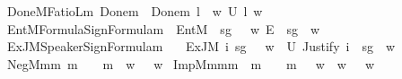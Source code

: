 \begin{isabellebody}
\isamarkupfalse%
\ DoneM{\isacharcolon}{\kern0pt}{\isacharcolon}{\kern0pt}{\isachardoublequoteopen}FatioL{\isasymRightarrow}{\isasymsigma}\isactrlsub m{\isachardoublequoteclose}\ {\isacharparenleft}{\kern0pt}{\isachardoublequoteopen}Done\isactrlsup m{\isachardoublequoteclose}{\isacharparenright}{\kern0pt}\ \ {\isachardoublequoteopen}Done\isactrlsup m\ l\ {\isasymequiv}\ {\isasymlambda}w{\isachardot}{\kern0pt}\ U\ l\ w{\isachardoublequoteclose}\isanewline
{}\isamarkupfalse%
\ EntM{\isacharcolon}{\kern0pt}{\isacharcolon}{\kern0pt}{\isachardoublequoteopen}Formula{\isasymRightarrow}Sign{\isasymRightarrow}Formula{\isasymRightarrow}{\isasymsigma}\isactrlsub m{\isachardoublequoteclose}\ \ {\isachardoublequoteopen}EntM\ {\isasymPhi}\ sg\ {\isasymphi}\ {\isasymequiv}\ {\isasymlambda}w{\isachardot}{\kern0pt}\ E\ {\isasymPhi}\ sg\ {\isasymphi}\ w{\isachardoublequoteclose}\isanewline
{}\isamarkupfalse%
\ ExJM{\isacharcolon}{\kern0pt}{\isacharcolon}{\kern0pt}{\isachardoublequoteopen}Speaker{\isasymRightarrow}Sign{\isasymRightarrow}Formula{\isasymRightarrow}{\isasymsigma}\isactrlsub m{\isachardoublequoteclose}\ \isanewline
\ \ {\isachardoublequoteopen}ExJM\ i\ sg\ {\isasymphi}\ {\isasymequiv}\ {\isasymlambda}w{\isachardot}{\kern0pt}\ {\isasymexists}{\isasymDelta}{\isachardot}{\kern0pt}\ U\ {\isacharparenleft}{\kern0pt}Justify\ i\ {\isasymDelta}\ sg\ {\isasymphi}{\isacharparenright}{\kern0pt}\ w{\isachardoublequoteclose}\isanewline
{}\isamarkupfalse%
\ NegM{\isacharcolon}{\kern0pt}{\isacharcolon}{\kern0pt}{\isachardoublequoteopen}{\isasymsigma}\isactrlsub m{\isasymRightarrow}{\isasymsigma}\isactrlsub m{\isachardoublequoteclose}\ {\isacharparenleft}{\kern0pt}{\isachardoublequoteopen}{\isasymnot}\isactrlsup m{\isacharunderscore}{\kern0pt}{\isachardoublequoteclose}\ {\isacharbrackleft}{\kern0pt}{}{}{\isacharbrackright}{\kern0pt}\ {}{}{\isacharparenright}{\kern0pt}\ \ {\isachardoublequoteopen}{\isasymnot}\isactrlsup m{\isasymphi}\ {\isasymequiv}\ {\isasymlambda}w{\isachardot}{\kern0pt}\ {\isasymnot}\ {\isasymphi}\ w{\isachardoublequoteclose}\isanewline
{}\isamarkupfalse%
\ ImpM{\isacharcolon}{\kern0pt}{\isacharcolon}{\kern0pt}{\isachardoublequoteopen}{\isasymsigma}\isactrlsub m{\isasymRightarrow}{\isasymsigma}\isactrlsub m{\isasymRightarrow}{\isasymsigma}\isactrlsub m{\isachardoublequoteclose}\ {\isacharparenleft}{\kern0pt}\ {\isachardoublequoteopen}{\isasymsupset}\isactrlsup m{\isachardoublequoteclose}\ {}{}{\isacharparenright}{\kern0pt}\ \ {\isachardoublequoteopen}{\isasymphi}\ {\isasymsupset}\isactrlsup m\ {\isasympsi}\ {\isasymequiv}\ {\isasymlambda}w{\isachardot}{\kern0pt}\ {\isasymphi}\ w\ {\isasymlongrightarrow}\ {\isasympsi}\ w{\isachardoublequoteclose}\isanewline

\end{isabellebody}
